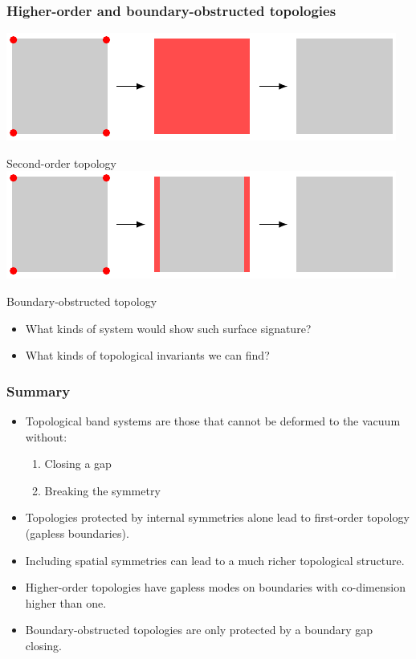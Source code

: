 \documentclass{beamer}
\renewcommand{\(}{\left(}
\renewcommand{\)}{\right)}
\renewcommand{\[}{\left[}
\renewcommand{\]}{\right]}
\begin{document}
\begin{frame}
    \frametitle{Higher-order and boundary-obstructed topologies}
    \centering 
    \includegraphics[]{seond_order_boudary.pdf}

    \vspace{5pt}
    Second-order topology 
    \vfill
    \includegraphics[]{boundary_obstructed.pdf}

    \vspace{5pt}
    Boundary-obstructed topology

    \begin{itemize}
        \item What kinds of system would show such surface signature?
        \item What kinds of topological invariants we can find?
    \end{itemize}

\end{frame}

\begin{frame}
    \frametitle{Summary}

    \begin{itemize}
        \item Topological band systems are those that cannot be deformed to the vacuum without: \begin{enumerate}
            \item Closing a gap
            \item Breaking the symmetry
        \end{enumerate}
        \item Topologies protected by internal symmetries alone lead to first-order topology (gapless boundaries). 
        \item Including spatial symmetries can lead to a much richer topological structure. 
        \item Higher-order topologies have gapless modes on boundaries with co-dimension higher than one. 
        \item Boundary-obstructed topologies are only protected by a boundary gap closing. 
    \end{itemize}    

\end{frame}
\end{document}
